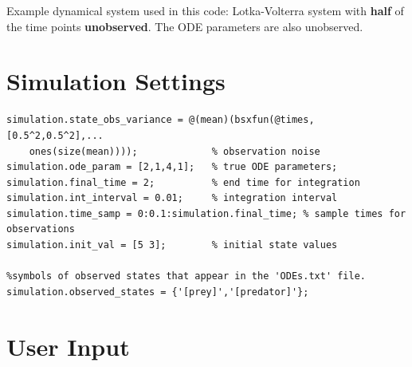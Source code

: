 Example dynamical system used in this code: Lotka-Volterra system with \textbf{half} of the time points \textbf{unobserved}. The ODE parameters are also unobserved.

\section{Simulation Settings}

\color{RoyalPurple}\begin{verbatim}
simulation.state_obs_variance = @(mean)(bsxfun(@times,[0.5^2,0.5^2],...
    ones(size(mean))));             % observation noise
simulation.ode_param = [2,1,4,1];   % true ODE parameters;
simulation.final_time = 2;          % end time for integration
simulation.int_interval = 0.01;     % integration interval
simulation.time_samp = 0:0.1:simulation.final_time; % sample times for observations
simulation.init_val = [5 3];        % initial state values

%symbols of observed states that appear in the 'ODEs.txt' file.
simulation.observed_states = {'[prey]','[predator]'};
\end{verbatim}
\color{black}


\section{User Input}

